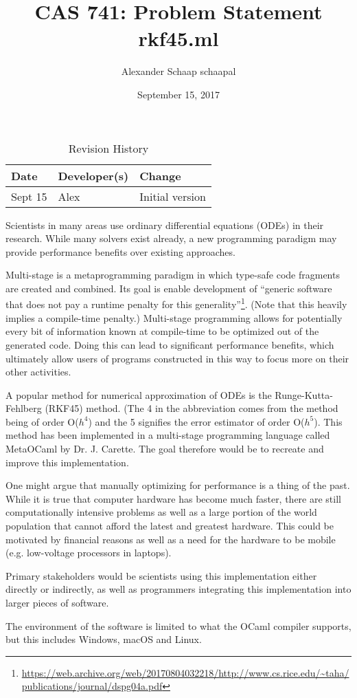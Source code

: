 \documentclass{article}
\title{CAS 741: Problem Statement\\rkf45.ml}
\author{Alexander Schaap schaapal}
\date{September 15, 2017}
\begin{document}
\maketitle

\begin{table}[hp]
\caption{Revision History} \label{TblRevisionHistory}
\begin{tabularx}{\textwidth}{llX}
\toprule
\textbf{Date} & \textbf{Developer(s)} & \textbf{Change}\\
\midrule
Sept 15 & Alex & Initial version\\
\bottomrule
\end{tabularx}
\end{table}

%
%
%

Scientists in many areas use ordinary differential equations (ODEs) in their research.
While many solvers exist already, a new programming paradigm may provide performance benefits over existing approaches.

Multi-stage is a metaprogramming paradigm in which type-safe code fragments are created and combined.
Its goal is enable development of ``generic software that does not pay a runtime penalty for this generality''\footnote{\url{https://web.archive.org/web/20170804032218/http://www.cs.rice.edu/~taha/publications/journal/dspg04a.pdf}}.
(Note that this heavily implies a compile-time penalty.)
Multi-stage programming allows for potentially every bit of information known at compile-time to be optimized out of the generated code.
Doing this can lead to significant performance benefits, which ultimately allow users of programs constructed in this way to focus more on their other activities.

A popular method for numerical approximation of ODEs is the Runge-Kutta-Fehlberg (RKF45) method.
(The 4 in the abbreviation comes from the method being of order O($h^4$) and the 5 signifies the error estimator of order O($h^5$).
This method has been implemented in a multi-stage programming language called MetaOCaml by Dr. J. Carette.
The goal therefore would be to recreate and improve this implementation.

One might argue that manually optimizing for performance is a thing of the past.
While it is true that computer hardware has become much faster, there are still computationally intensive problems as well as a large portion of the world population that cannot afford the latest and greatest hardware.
This could be motivated by financial reasons as well as a need for the hardware to be mobile (e.g. low-voltage processors in laptops).

Primary stakeholders would be scientists using this implementation either directly or indirectly, as well as programmers integrating this implementation into larger pieces of software.

The environment of the software is limited to what the OCaml compiler supports, but this includes Windows, macOS and Linux.
\end{document}
